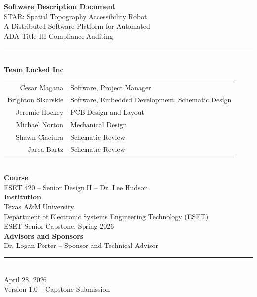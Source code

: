 \documentclass[11pt,letterpaper]{article}
\begin{document}
\thispagestyle{empty}

\begin{center}
\vspace*{1.0in}
{\Huge \bfseries Software Description Document}\\[0.35in]
{\LARGE STAR: Spatial Topography Accessibility Robot}\\[0.20in]
{\large A Distributed Software Platform for Automated}\\
{\large ADA Title III Compliance Auditing}\\[0.8in]

\rule{4.5in}{0.8pt}\\[0.3in]

{\large \textbf{Team Locked Inc}}\\[0.15in]
\begin{tabular}{r l}
Cesar Magana        & Software, Project Manager \\
Brighton Sikarskie  & Software, Embedded Development, Schematic Design \\
Jeremie Hockey      & PCB Design and Layout \\
Michael Norton      & Mechanical Design \\
Shawn Ciaciura      & Schematic Review \\
Jared Bartz         & Schematic Review \\
\end{tabular}\\[0.4in]

{\large \textbf{Course}}\\[0.1in]
{\normalsize ESET 420 -- Senior Design II -- Dr. Lee Hudson}\\[0.4in]

{\large \textbf{Institution}}\\[0.1in]
{\normalsize Texas A\&M University}\\
{\normalsize Department of Electronic Systems Engineering Technology (ESET)}\\
{\normalsize ESET Senior Capstone, Spring 2026}\\[0.4in]

{\large \textbf{Advisors and Sponsors}}\\[0.1in]
{\normalsize Dr. Logan Porter -- Sponsor and Technical Advisor}\\[0.6in]

\rule{4.5in}{0.8pt}\\[0.2in]
{\large April 28, 2026}\\[0.15in]
{\small Version 1.0 -- Capstone Submission}

\end{center}
\clearpage
\end{document}
